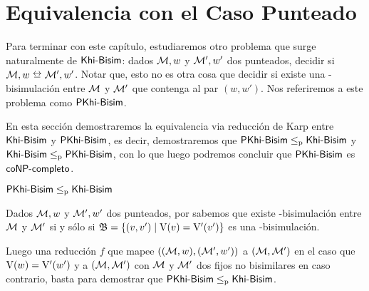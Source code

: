 

    

\section{Equivalencia con el Caso Punteado}

Para terminar con este capítulo, estudiaremos otro problema que surge naturalmente de $\rm\textsf{Khi-Bisim}$: dados $\mathcal{M},w$ y $\mathcal{M}',w'$ 
dos \ultss punteados, decidir si $\modults,w \bisim \modults',w'$. Notar que, esto no es otra cosa que decidir si existe una 
\KHilogic-bisimulación entre $\mathcal{M}$ y $\mathcal{M}'$ que contenga al par $(w,w')$. Nos referiremos a este problema como $\rm\textsf{PKhi-Bisim}$.

En esta sección demostraremos la equivalencia via reducción de Karp entre $\rm\textsf{Khi-Bisim}$ y $\rm\textsf{PKhi-Bisim}$, es decir, demostraremos que 
$\rm\textsf{PKhi-Bisim} \leq_p \rm\textsf{Khi-Bisim}$ y $\rm\textsf{Khi-Bisim} \leq_p \rm\textsf{PKhi-Bisim}$, con lo que luego podremos concluir que $\rm\textsf{PKhi-Bisim}$ es $\rm\textsf{coNP-completo}$.

\begin{lema}\label{lema:pointed-to-general}
    $\rm\textsf{PKhi-Bisim} \leq_p \rm\textsf{Khi-Bisim}$
\end{lema}

\begin{demostracion}
    Dados $\mathcal{M},w$ y $\mathcal{M}',w'$ dos \ultss punteados, por  sabemos que existe 
    \KHilogic-bisimulación entre $\mathcal{M}$ y $\mathcal{M}'$ si y sólo si $\mathfrak{B} = \{(v,v') \mid \mathrm{V}(v) = \mathrm{V}'(v')\}$ es una 
    \KHilogic-bisimulación. 
    
    Luego una reducción $f$ que mapee $((\mathcal{M},w),(\mathcal{M}',w'))$ a $(\mathcal{M},\mathcal{M}')$ en el caso que $\mathrm{V}(w) = \mathrm{V}'(w')$ 
    y a $(\mathcal{M},\mathcal{M}')$ con $\mathcal{M}$ y $\mathcal{M}'$ dos \ultss fijos no bisimilares en caso contrario, basta 
    para demostrar que $\rm\textsf{PKhi-Bisim} \leq_p \rm\textsf{Khi-Bisim}$.
\end{demostracion}

